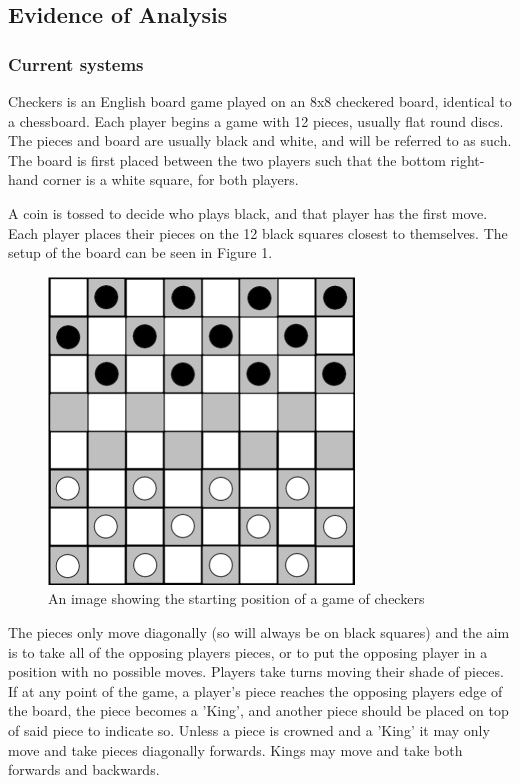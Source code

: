 \documentclass{article}
\makeatletter
\newcommand\subsubsubsection{\@startsection{paragraph}{4}{\z@}{-2.5ex\@plus -1ex \@minus -.25ex}{1.25ex \@plus .25ex}{\normalfont\normalsize\bfseries}}
\makeatother
\begin{document}
    \pagebreak
    
    \subsection{Evidence of Analysis}

    \subsubsection{Current systems}

    \subsubsubsection{Checkers} \label{checkers}
    Checkers is an English board game played on an 8x8 checkered board, identical to a chessboard.
    Each player begins a game with 12 pieces, usually flat round discs.
    The pieces and board are usually black and white, and will be referred to as such.
    The board is first placed between the two players such that the bottom right-hand corner is a white square,
    for both players.
    
    A coin is tossed to decide who plays black, and that player has the first move. Each player places their pieces
    on the 12 black squares closest to themselves. The setup of the board can be seen in Figure 1. 

    \begin{figure}
        \centering
        \includegraphics[scale=0.35]{The-starting-position-for-checkers.png}
        \caption{An image showing the starting position of a game of checkers}
    \end{figure}
    The pieces only move diagonally (so will always be on black squares)
    and the aim is to take all of the opposing players pieces, or to put the opposing player in a position with no possible moves.
    Players take turns moving their shade of pieces. If at any point of the game, a player's piece reaches the opposing players edge
    of the board, the piece becomes a 'King', and another piece should be placed on top of said piece to indicate so.
    Unless a piece is crowned and a 'King' it may only move and take pieces diagonally forwards. Kings may move and take both forwards and backwards.
    
\end{document}
